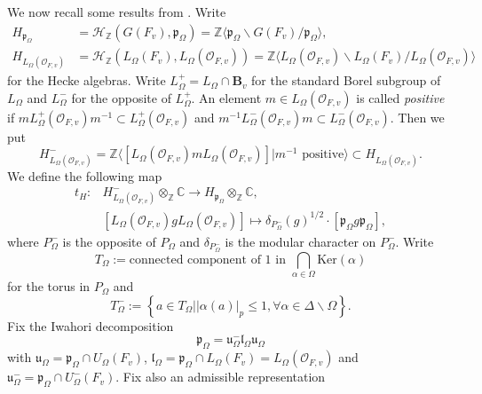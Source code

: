 \documentclass[12pt,oneside,reqno]{amsart}
\theoremstyle{plain}
\begin{document}
	
	We now recall some results from
	\cite{Vigneras1998}.
	Write
	\begin{align*}
		H_{\mathfrak{p}_\Omega}
		&
		=
		\mathcal{H}_\mathbb{Z}( G(F_v),\mathfrak{p}_\Omega)
		=
		\mathbb{Z}
		\langle
		\mathfrak{p}_\Omega\backslash
		G(F_v)/\mathfrak{p}_\Omega
		\rangle,
		\\
		H_{L_\Omega(\mathcal{O}_{F,v})}
		&
		=
		\mathcal{H}_\mathbb{Z}
		(L_\Omega(F_v),L_\Omega(\mathcal{O}_{F,v}))
		=
		\mathbb{Z}
		\langle
		L_\Omega(\mathcal{O}_{F,v})\backslash
		L_\Omega(F_v)/L_\Omega(\mathcal{O}_{F,v})
		\rangle
	\end{align*}
	for the Hecke algebras.
	Write
	$L_\Omega^+=L_\Omega\cap\mathbf{B}_v$
	for the standard Borel subgroup of
	$L_\Omega$ and
	$L_\Omega^-$
	for the opposite of
	$L_\Omega^+$.
	An element
	$m\in L_\Omega(\mathcal{O}_{F,v})$
	is called
	\emph{positive} if
	$mL_\Omega^+(\mathcal{O}_{F,v})m^{-1}\subset
	L_\Omega^+(\mathcal{O}_{F,v})$
	and
	$m^{-1}L_\Omega^-(\mathcal{O}_{F,v})m
	\subset
	L_\Omega^-(\mathcal{O}_{F,v})$.
	Then we put
	\[
	H_{L_\Omega(\mathcal{O}_{F,v})}^-
	=
	\mathbb{Z}
	\langle
	[
	L_\Omega(\mathcal{O}_{F,v})
	m
	L_\Omega(\mathcal{O}_{F,v})
	]
	|m^{-1}
	\text{ positive}
	\rangle
	\subset
	H_{L_\Omega(\mathcal{O}_{F,v})}.
	\]
	We define the following map
	\begin{align*}
		t_H
		\colon
		&
		H_{L_\Omega(\mathcal{O}_{F,v})}^-
		\otimes_\mathbb{Z}\mathbb{C}
		\rightarrow
		H_{\mathfrak{p}_\Omega}
		\otimes_\mathbb{Z}\mathbb{C},
		\\
		&
		[L_\Omega(\mathcal{O}_{F,v})g
		L_\Omega(\mathcal{O}_{F,v})]
		\mapsto
		\delta_{P_\Omega^-}
		(g)^{1/2}
		\cdot
		[\mathfrak{p}_\Omega
		g
		\mathfrak{p}_\Omega],
	\end{align*}
	where
	$P_\Omega^-$
	is the opposite of
	$P_\Omega$
	and
	$\delta_{P_\Omega^-}$
	is the modular character on
	$P_\Omega^-$.
	Write
	\[
	T_\Omega
	:=
	\text{connected component of }
	1
	\text{ in }
	\bigcap_{\alpha\in\Omega}
	\mathrm{Ker}(\alpha)
	\]
	for the torus in $P_\Omega$
	and
	\[
	T_\Omega^-
	:=
	\left\{
	a\in T_\Omega
	|
	|\alpha(a)|_p\le1,
	\forall
	\alpha\in\Delta\backslash\Omega
	\right\}.
	\]
	Fix the Iwahori decomposition
	\[
	\mathfrak{p}_\Omega
	=
	\mathfrak{u}_\Omega^-\mathfrak{l}_\Omega\mathfrak{u}_\Omega
	\]
	with
	$\mathfrak{u}_\Omega
	=
	\mathfrak{p}_\Omega
	\cap
	U_\Omega(F_v)$,
	$\mathfrak{l}_\Omega
	=
	\mathfrak{p}_\Omega\cap
	L_\Omega(F_v)
	=
	L_\Omega(\mathcal{O}_{F,v})$
	and
	$\mathfrak{u}_\Omega^-
	=
	\mathfrak{p}_\Omega\cap
	U_\Omega^-(F_v)$.
	Fix also an admissible representation
\end{document}
